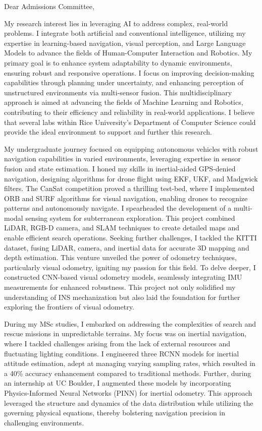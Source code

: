 \documentclass[a4,20pt]{article}
\begin{document}
\begin{large} 
Dear Admissions Committee,

My research interest lies in leveraging AI to address complex, real-world problems. I integrate both artificial and conventional intelligence, utilizing my expertise in learning-based navigation, visual perception, and Large Language Models to advance the fields of Human-Computer Interaction and Robotics. My primary goal is to enhance system adaptability to dynamic environments, ensuring robust and responsive operations. I focus on improving decision-making capabilities through planning under uncertainty, and enhancing perception of unstructured environments via multi-sensor fusion. This multidisciplinary approach is aimed at advancing the fields of Machine Learning and Robotics, contributing to their efficiency and reliability in real-world applications. I believe that several labs within Rice University's Department of Computer Science could provide the ideal environment to support and further this research.


My undergraduate journey focused on equipping autonomous vehicles with robust navigation capabilities in varied environments, leveraging expertise in sensor fusion and state estimation. I honed my skills in inertial-aided GPS-denied navigation, designing algorithms for drone flight using EKF, UKF, and Madgwick filters. The CanSat competition proved a thrilling test-bed, where I implemented ORB and SURF algorithms for visual navigation, enabling drones to recognize patterns and autonomously navigate. I spearheaded the development of a multi-modal sensing system for subterranean exploration. This project combined LiDAR, RGB-D camera, and SLAM techniques to create detailed maps and enable efficient search operations. Seeking further challenges, I tackled the KITTI dataset, fusing LiDAR, camera, and inertial data for accurate 3D mapping and depth estimation. This venture unveiled the power of odometry techniques, particularly visual odometry, igniting my passion for this field. To delve deeper, I constructed CNN-based visual odometry models, seamlessly integrating IMU measurements for enhanced robustness. This project not only solidified my understanding of INS mechanization but also laid the foundation for further exploring the frontiers of visual odometry.


During my MSc studies, I embarked on addressing the complexities of search and rescue missions in unpredictable terrains. My focus was on inertial navigation, where I tackled challenges arising from the lack of external resources and fluctuating lighting conditions. I engineered three RCNN models for inertial attitude estimation, adept at managing varying sampling rates, which resulted in a 40\% accuracy enhancement compared to traditional methods. Further, during an internship at UC Boulder, I augmented these models by incorporating Physics-Informed Neural Networks (PINN) for inertial odometry. This approach leveraged the structure and dynamics of the data distribution while utilizing the governing physical equations, thereby bolstering navigation precision in challenging environments.


\end{large}
\end{document}
